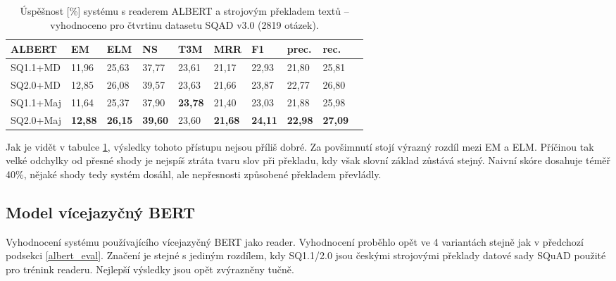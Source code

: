 \begin{table}[H]
    \centering
    \begin{tabular}{|l||l|l|l|l|l|l|l|l|l|}
        \hline
        \textbf{ALBERT}  & \textbf{EM}   & ELM       & NS        & T3M       & MRR       & \textbf{F1}   & prec.         & rec. \\ \hline\hline
            SQ1.1+MD    & 11,96         & 25,63     & 37,77     & 23,61     & 21,17     & 22,93         & 21,80         & 25,81    \\ \hline
            SQ2.0+MD    & 12,85         & 26,08     & 39,57     & 23,63     & 21,66     & 23,87         & 22,77         & 26,80    \\ \hline
            SQ1.1+Maj   & 11,64         & 25,37     & 37,90     & \textbf{23,78}     & 21,40     & 23,03         & 21,88         & 25,98    \\ \hline
            SQ2.0+Maj   & \textbf{12,88}& \textbf{26,15}& \textbf{39,60}& 23,60     & \textbf{21,68}     & \textbf{24,11}         & \textbf{22,98}         & \textbf{27,09}    \\ \hline
    \end{tabular}
    \caption{Úspěšnost [\%] systému s readerem ALBERT a strojovým překladem textů -- vyhodnoceno pro čtvrtinu datasetu SQAD v3.0 (2819 otázek).}
    \label{tab:system_eval_albert}
\end{table}
Jak je vidět v tabulce \ref{tab:system_eval_albert}, výsledky tohoto přístupu nejsou příliš dobré. Za povšimnutí stojí výrazný rozdíl mezi EM a ELM. Příčinou tak velké odchylky od přesné shody je nejspíš ztráta tvaru slov při překladu, kdy však slovní základ zůstává stejný. Naivní skóre dosahuje téměř 40\%, nějaké shody tedy systém dosáhl, ale nepřesnosti způsobené překladem převládly.

\subsection{Model vícejazyčný BERT}
\label{mbert_eval}
Vyhodnocení systému používajícího vícejazyčný BERT jako reader. Vyhodnocení proběhlo opět ve 4 variantách stejně jak v předchozí podsekci \ref{albert_eval}. Značení je stejné s jediným rozdílem, kdy SQ1.1/2.0 jsou českými strojovými překlady datové sady SQuAD použité pro trénink readeru. Nejlepší výsledky jsou opět zvýrazněny tučně.

